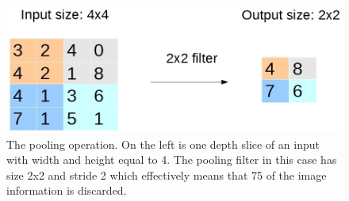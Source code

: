 \documentclass{article}
\begin{document}
\begin{figure}[H]
\begin{center}
\includegraphics[scale=0.4]{rsz_1pooling}
\end{center}
\caption{The pooling operation. On the left is one depth slice of an input with width and height equal to 4. The pooling filter in this case has size 2x2 and stride 2 which effectively means that 75\text{\%} of the image information is discarded.}
\end{figure}
\end{document}
